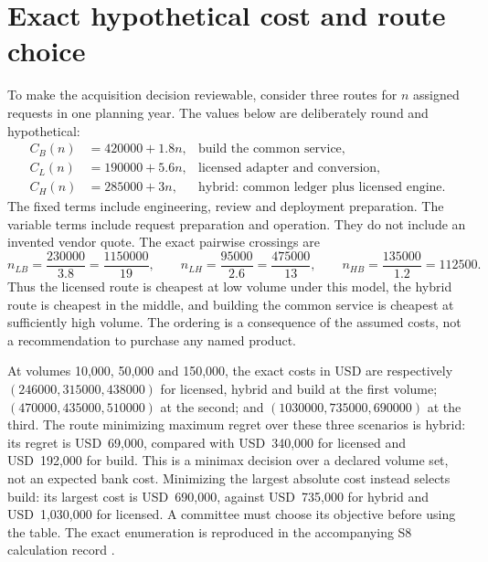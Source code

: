 

\section{Exact hypothetical cost and route choice}
\label{exec17:s8-cost}

To make the acquisition decision reviewable, consider three routes for $n$
assigned requests in one planning year. The values below are deliberately
round and hypothetical:
\begin{align}
 C_B(n)&=420000+1.8n, &\text{build the common service},\\
 C_L(n)&=190000+5.6n, &\text{licensed adapter and conversion},\\
 C_H(n)&=285000+3n, &\text{hybrid: common ledger plus licensed engine}.
 \label{exec17:s8-costs}
\end{align}
The fixed terms include engineering, review and deployment preparation. The
variable terms include request preparation and operation. They do not include
an invented vendor quote. The exact pairwise crossings are
\begin{equation}
 n_{LB}=\frac{230000}{3.8}=\frac{1150000}{19},\qquad
 n_{LH}=\frac{95000}{2.6}=\frac{475000}{13},\qquad
 n_{HB}=\frac{135000}{1.2}=112500.
 \label{exec17:s8-crossings}
\end{equation}
Thus the licensed route is cheapest at low volume under this model, the
hybrid route is cheapest in the middle, and building the common service is
cheapest at sufficiently high volume. The ordering is a consequence of the
assumed costs, not a recommendation to purchase any named product.

At volumes 10,000, 50,000 and 150,000, the exact costs in USD are respectively
$(246000,315000,438000)$ for licensed, hybrid and build at the first volume;
$(470000,435000,510000)$ at the second; and $(1030000,735000,690000)$ at the
third. The route minimizing maximum regret over these three scenarios is hybrid:
its regret is USD~69,000, compared with USD~340,000 for licensed and USD~192,000 for
build. This is a minimax decision over a declared volume set, not an expected
bank cost. Minimizing the largest absolute cost instead selects build: its
largest cost is USD~690,000, against USD~735,000 for hybrid and USD~1,030,000
for licensed. A committee must choose its objective before using the table.
The exact enumeration is reproduced in the accompanying S8 calculation record
\citep{exec17_s8_examples}.

